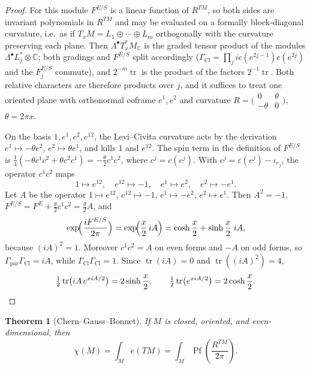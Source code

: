 \documentclass[11pt,oneside,reqno]{book}
\DeclareMathOperator{\Cl}{Cl}
\newcommand{\C}{\mathbb C}
\theoremstyle{plain}
\newtheorem{theorem}{Theorem}[chapter]
\theoremstyle{definition}
\theoremstyle{remark}
\begin{document}
\begin{proof}
For this module \(F^{E/S}\) is a linear function of \(R^{TM}\), so both
sides are invariant polynomials in \(R^{TM}\) and may be evaluated on a
formally block-diagonal curvature, i.e.\ as if
\(T_xM=L_1\oplus\cdots\oplus L_m\) orthogonally with the curvature
preserving each plane.  Then \(\Lambda^\bullet T_x^*M_\C\) is the graded
tensor product of the modules \(\Lambda^\bullet L_j^*\otimes\C\); both
gradings and \(F^{E/S}\) split accordingly (\(\Gamma_{\Cl}=\prod_j ic(e^{2j-1})c(e^{2j})\) and the
\(F^{E/S}_j\) commute), and \(2^{-m}\operatorname{tr}\) is the product of
the factors \(2^{-1}\operatorname{tr}\).  Both relative characters are
therefore products over \(j\), and it suffices to treat one oriented plane
with orthonormal coframe \(e^1,e^2\) and curvature
\(R=\bigl(\begin{smallmatrix}0&\theta\\-\theta&0\end{smallmatrix}\bigr)\),
\(\theta=2\pi x\).

On the basis \(1,e^1,e^2,e^{12}\), the Levi--Civita curvature acts by the
derivation \(e^1\mapsto-\theta e^2\), \(e^2\mapsto\theta e^1\), and kills
\(1\) and \(e^{12}\).  The spin term in the definition of \(F^{E/S}\) is
\(\frac14(-\theta c^1c^2+\theta c^2c^1)=-\frac\theta2c^1c^2\), where
\(c^j=c(e^j)\).  With \(c^j=\varepsilon(e^j)-\iota_{e_j}\), the operator
\(c^1c^2\) maps
\[
 1\mapsto e^{12},\quad e^{12}\mapsto-1,\quad
 e^1\mapsto e^2,\quad e^2\mapsto-e^1.
\]
Let \(A\) be the operator \(1\mapsto e^{12}\), \(e^{12}\mapsto-1\),
\(e^1\mapsto-e^2\), \(e^2\mapsto e^1\).  Then \(A^2=-1\),
\(F^{E/S}=F^E+\frac\theta2c^1c^2=\frac\theta2A\), and
\[
 \exp\!\Bigl(\frac{iF^{E/S}}{2\pi}\Bigr)
 =\exp\!\Bigl(\frac x2\,iA\Bigr)
 =\cosh\frac x2+\sinh\frac x2\;iA,
\]
because \((iA)^2=1\).  Moreover \(c^1c^2=A\) on even forms and \(-A\) on
odd forms, so \(\Gamma_{\mathrm{par}}\Gamma_{\Cl}=iA\), while
\(\Gamma_{\Cl}\Gamma_{\Cl}=1\).  Since \(\operatorname{tr}(iA)=0\) and
\(\operatorname{tr}((iA)^2)=4\),
\[
 \tfrac12\operatorname{tr}\bigl(iA\,e^{xiA/2}\bigr)=2\sinh\frac x2,
 \qquad
 \tfrac12\operatorname{tr}\bigl(e^{xiA/2}\bigr)=2\cosh\frac x2.
 \qedhere
\]
\end{proof}

\begin{theorem}[Chern--Gauss--Bonnet]\label{thm:gauss-bonnet}
If \(M\) is closed, oriented, and even-dimensional, then
\[
 \chi(M)
 =
 \int_M e(TM)
 =
 \int_M\operatorname{Pf}\!\left(\frac{R^{TM}}{2\pi}\right).
\]
\end{theorem}
\end{document}
